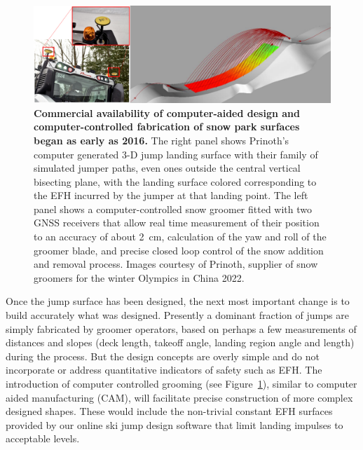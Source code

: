 \documentclass[smallextended]{svjour3}       %
\begin{document}
%
\begin{figure}
  \centering
  \includegraphics[width=\columnwidth]{figures/prinoth.png}
  \caption{\textbf{Commercial availability of computer-aided design and
    computer-controlled fabrication of snow park surfaces began as early as
    2016.} The right panel shows Prinoth's computer generated 3-D jump landing
    surface with their family of simulated jumper paths, even ones outside the
    central vertical bisecting plane, with the landing surface colored
    corresponding to the EFH incurred by the jumper at that landing point. The
    left panel shows a computer-controlled snow groomer fitted with two GNSS
    receivers that allow real time measurement of their position to an accuracy
    of about 2~\si{\centi\meter}, calculation of the yaw and roll of the
    groomer blade, and precise closed loop control of the snow addition and
    removal process.  Images courtesy of Prinoth, supplier of snow groomers for
  the winter Olympics in China 2022.}
  \label{fig:prinoth}
\end{figure}

Once the jump surface has been designed, the next most important change is to build accurately what was designed. Presently a dominant fraction of jumps are simply
fabricated by groomer operators, based on perhaps a few measurements of
distances and slopes (deck length, takeoff angle, landing region angle and length) during the process. But the design concepts are overly simple and do not
incorporate or address quantitative indicators of safety such as EFH. The
introduction of computer controlled grooming (see Figure~\ref{fig:prinoth}), similar to computer aided manufacturing
(CAM), will facilitate precise construction of more complex designed
shapes. These would include the non-trivial constant EFH surfaces provided by
our online ski jump design software that limit landing impulses to acceptable
levels.
\end{document}

